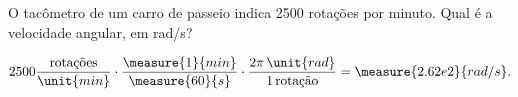 \begin{question}
    O tacômetro de um carro de passeio indica 2500 rotações por minuto.
    Qual é a velocidade angular, em \unit{rad/s}?

    \begin{answer}
    \end{answer}

    \begin{solution}
      \begin{equation*}
        2500 \frac{\text{rotações}}{\unit{min}} \cdot \frac{\measure{1}{min}}{\measure{60}{s}} \cdot \frac{2\pi\,\unit{rad}}{1\,\text{rotação}} = \measure{2.62e2}{rad/s}.
      \end{equation*}
    \end{solution}
\end{question}